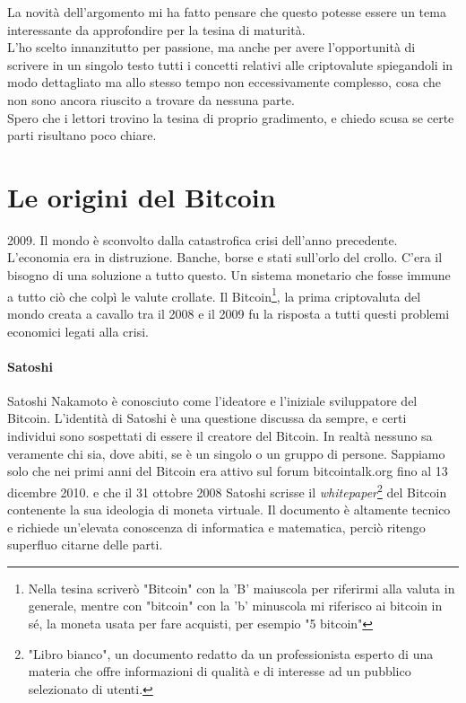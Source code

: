 \documentclass {article}
\begin{document}
\medskip
\noindent
%
La novità dell'argomento mi ha fatto pensare che questo potesse essere un tema interessante da approfondire per la tesina di maturità.\\

\medskip
\noindent
%
L'ho scelto innanzitutto per passione, ma anche per avere l'opportunità di scrivere in un singolo testo tutti i concetti relativi alle criptovalute spiegandoli in modo dettagliato ma allo stesso tempo non eccessivamente complesso, cosa che non sono ancora riuscito a trovare da nessuna parte.\\

\medskip
\noindent
%
Spero che i lettori trovino la tesina di proprio gradimento, e chiedo scusa se certe parti risultano poco chiare.

\newpage


\section {Le origini del Bitcoin}


2009. Il mondo è sconvolto dalla catastrofica crisi dell'anno precedente.
L'economia era in distruzione. Banche, borse e stati sull'orlo del crollo.
C'era il bisogno di una soluzione a tutto questo. Un sistema monetario che fosse immune a tutto ciò che colpì le valute crollate.
Il Bitcoin\footnote{Nella tesina scriverò "Bitcoin" con la 'B' maiuscola per riferirmi alla valuta in generale, mentre con "bitcoin" con la 'b' minuscola mi riferisco ai bitcoin in sé, la moneta usata per fare acquisti, per esempio "5 bitcoin"}, la prima criptovaluta del mondo creata a cavallo tra il 2008 e il 2009 fu la risposta a tutti questi problemi economici legati alla crisi.

\paragraph {Satoshi}

Satoshi Nakamoto è conosciuto come l'ideatore e l'iniziale sviluppatore del Bitcoin.
L'identità di Satoshi è una questione discussa da sempre, e certi individui sono sospettati di essere il creatore del Bitcoin.
In realtà nessuno sa veramente chi sia, dove abiti, se è un singolo o un gruppo di persone. Sappiamo solo che nei primi anni del Bitcoin era attivo sul forum bitcointalk.org fino al 13 dicembre 2010. e che il 31 ottobre 2008 Satoshi scrisse il \textit{whitepaper}\footnote{"Libro bianco", un documento redatto da un professionista esperto di una materia che offre informazioni di qualità e di interesse ad un pubblico selezionato di utenti.} del Bitcoin contenente la sua ideologia di moneta virtuale.
Il documento è altamente tecnico e richiede un'elevata conoscenza di informatica e matematica, perciò ritengo superfluo citarne delle parti. \cite{whitepaper}
\end{document}
